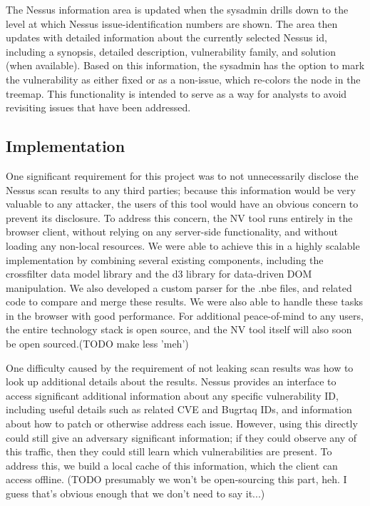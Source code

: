 \documentclass{acm_proc_article-sp}
\begin{document}
The Nessus information area is updated when the sysadmin drills down to the level at which Nessus issue-identification numbers are shown.
The area then updates with detailed information about the currently selected Nessus id, including a synopsis, detailed description, vulnerability family, and solution (when available).
Based on this information, the sysadmin has the option to mark the vulnerability as either fixed or as a non-issue, which re-colors the node in the treemap.
This functionality is intended to serve as a way for analysts to avoid revisiting issues that have been addressed.


\subsection{Implementation}

One significant requirement for this project was to not unnecessarily disclose the Nessus scan results to any third parties; because this information would be very valuable to any attacker, the users of this tool would have an obvious concern to prevent its disclosure.
To address this concern, the NV tool runs entirely in the browser client, without relying on any server-side functionality, and without loading any non-local resources.
We were able to achieve this in a highly scalable implementation by combining several existing components, including the crossfilter data model library and the d3 library for data-driven DOM manipulation.
We also developed a custom parser for the .nbe files, and related code to compare and merge these results.
 We were also able to handle these tasks in the browser with good performance.
For additional peace-of-mind to any users, the entire technology stack is open source, and the NV tool itself will also soon be open sourced.(TODO make less 'meh')

One difficulty caused by the requirement of not leaking scan results was how to look up additional details about the results.
Nessus provides an interface to access significant additional information about any specific vulnerability ID, including useful details such as related CVE and Bugrtaq IDs, and information about how to patch or otherwise address each issue.
However, using this directly could still give an adversary significant information; if they could observe any of this traffic, then they could still learn which vulnerabilities are present.
To address this, we build a local cache of this information, which the client can access offline.
(TODO presumably we won't be open-sourcing this part, heh.
I guess that's obvious enough that we don't need to say it...)
\end{document}
